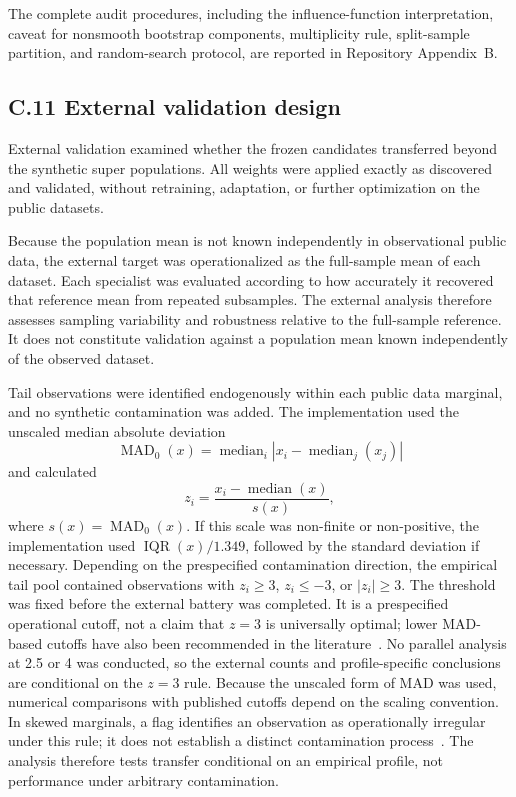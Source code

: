 The complete audit procedures, including the influence-function interpretation, caveat for nonsmooth bootstrap components, multiplicity rule, split-sample partition, and random-search protocol, are reported in Repository Appendix~B.

\subsection*{C.11 External validation design}
External validation examined whether the frozen candidates transferred beyond the synthetic super populations. All weights were applied exactly as discovered and validated, without retraining, adaptation, or further optimization on the public datasets.

Because the population mean is not known independently in observational public data, the external target was operationalized as the full-sample mean of each dataset. Each specialist was evaluated according to how accurately it recovered that reference mean from repeated subsamples. The external analysis therefore assesses sampling variability and robustness relative to the full-sample reference. It does not constitute validation against a population mean known independently of the observed dataset.

Tail observations were identified endogenously within each public data marginal, and no synthetic contamination was added. The implementation used the unscaled median absolute deviation
\[
\operatorname{MAD}_0(x)
=
\operatorname{median}_i\left|x_i-\operatorname{median}_j(x_j)\right|
\]
and calculated
\[
z_i=\frac{x_i-\operatorname{median}(x)}{s(x)},
\]
where $s(x)=\operatorname{MAD}_0(x)$. If this scale was non-finite or non-positive, the implementation used $\operatorname{IQR}(x)/1.349$, followed by the standard deviation if necessary. Depending on the prespecified contamination direction, the empirical tail pool contained observations with $z_i\geq3$, $z_i\leq-3$, or $|z_i|\geq3$. The threshold was fixed before the external battery was completed. It is a prespecified operational cutoff, not a claim that $z=3$ is universally optimal; lower MAD-based cutoffs have also been recommended in the literature~\citep{leys2013outliers}. No parallel analysis at 2.5 or 4 was conducted, so the external counts and profile-specific conclusions are conditional on the $z=3$ rule. Because the unscaled form of MAD was used, numerical comparisons with published cutoffs depend on the scaling convention. In skewed marginals, a flag identifies an observation as operationally irregular under this rule; it does not establish a distinct contamination process~\citep{leys2013outliers,berger2021rtoutliers,miller2023rtoutliers}. The analysis therefore tests transfer conditional on an empirical profile, not performance under arbitrary contamination.

